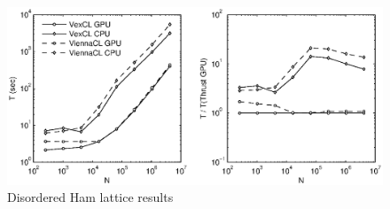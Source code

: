 \documentclass[1p]{elsarticle}
\begin{document}
\begin{figure}
    \begin{center}
	\includegraphics[width=\textwidth]{data/disordered_ham_lattice/perfcmp}
    \end{center}
    \caption{Disordered Ham lattice results}
    \label{fig:phase:perf}
\end{figure}
\end{document}
